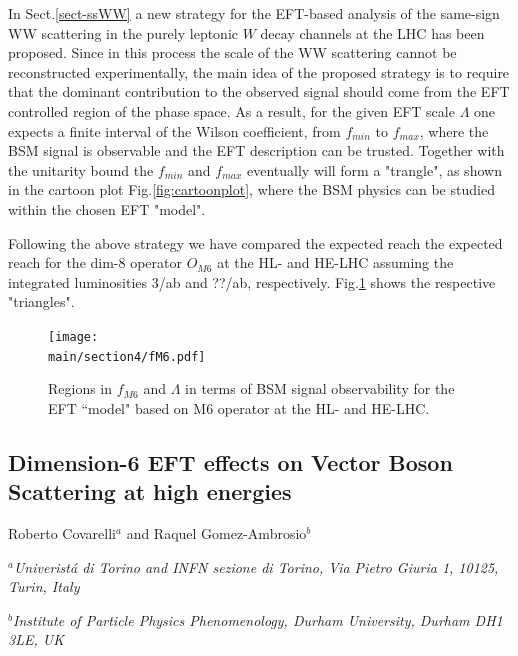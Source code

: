 \documentclass[../report.tex]{subfiles}
\providecommand{\main}{..}
\begin{document}
In Sect.\ref{sect-ssWW} a new strategy for the EFT-based analysis of the same-sign WW scattering  in the purely leptonic $W$ decay channels at the LHC has been proposed. Since in this process the scale of the WW scattering cannot be reconstructed experimentally, the main idea of the proposed strategy is to require that the dominant contribution to the observed signal should come from the EFT controlled region of the phase space. As a result, for the given EFT scale $\Lambda$ one expects a finite  interval of the Wilson coefficient,  from $f_{min}$ to $f_{max}$, where the BSM signal is observable and the EFT description can be trusted. Together with the unitarity bound  the $f_{min}$ and $f_{max}$ eventually will form a "trangle", as shown in the cartoon plot Fig.\ref{fig:cartoonplot}, where the BSM physics can be studied within the chosen EFT "model". 

Following the above strategy  we have compared the expected reach the expected reach for the dim-8 operator $O_{M6}$ at the HL- and HE-LHC  assuming the integrated luminosities 3/ab and ??/ab, respectively.  Fig.\ref{fig:fM6} shows the respective "triangles". 
\begin{figure}
\texttt{[image: \\main/section4/fM6.pdf]}
\caption{
Regions in $f_{M6}$ and $\Lambda$ in terms of BSM signal observability
for the EFT ``model"  based on M6 operator at the HL- and HE-LHC.}
\label{fig:fM6}
\end{figure}




\subsection{Dimension-6 EFT effects on Vector Boson Scattering at high energies}

\begin{center}
\bigskip\vspace{1cm}
{Roberto Covarelli$^{a}$ and  Raquel Gomez-Ambrosio$^{b}$}
\centerline{$^a${\it Univerist\'a di Torino and INFN sezione di Torino, Via Pietro Giuria 1, 10125, Turin, Italy}}
\centerline{$^b${\it Institute of Particle Physics Phenomenology, Durham University, Durham DH1 3LE, UK}}
\end{center}
\end{document}
